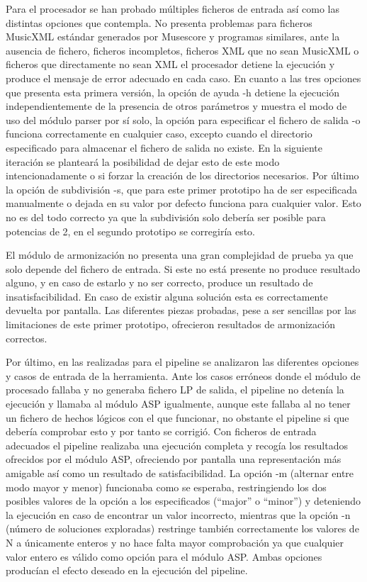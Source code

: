 Para el procesador se han probado múltiples ficheros de entrada así como las distintas opciones que contempla. No presenta problemas para ficheros MusicXML estándar generados por Musescore y programas similares, ante la ausencia de fichero, ficheros incompletos, ficheros XML que no sean MusicXML o ficheros que directamente no sean XML el procesador detiene la ejecución y produce el mensaje de error adecuado en cada caso. En cuanto a las tres opciones que presenta esta primera versión, la opción de ayuda -h detiene la ejecución independientemente de la presencia de otros parámetros y muestra el modo de uso del módulo parser por sí solo, la opción para especificar el fichero de salida -o funciona correctamente en cualquier caso, excepto cuando el directorio especificado para almacenar el fichero de salida no existe. En la siguiente iteración se planteará la posibilidad de dejar esto de este modo intencionadamente o si forzar la creación de los directorios necesarios. Por último la opción de subdivisión -s, que para este primer prototipo ha de ser especificada manualmente o dejada en su valor por defecto funciona para cualquier valor. Esto no es del todo correcto ya que la subdivisión solo debería ser posible para potencias de 2, en el segundo prototipo se corregiría esto.

El módulo de armonización no presenta una gran complejidad de prueba ya que solo depende del fichero de entrada. Si este no está presente no produce resultado alguno, y en caso de estarlo y no ser correcto, produce un resultado de insatisfacibilidad. En caso de existir alguna solución esta es correctamente devuelta por pantalla. Las diferentes piezas probadas, pese a ser sencillas por las limitaciones de este primer prototipo, ofrecieron resultados de armonización correctos.

Por último, en las realizadas para el pipeline se analizaron las diferentes opciones y casos de entrada de la herramienta. Ante los casos erróneos donde el módulo de procesado fallaba y no generaba fichero LP de salida, el pipeline no detenía la ejecución y llamaba al módulo ASP igualmente, aunque este fallaba al no tener un fichero de hechos lógicos con el que funcionar, no obstante el pipeline si que debería comprobar esto y por tanto se corrigió. Con ficheros de entrada adecuados el pipeline realizaba una ejecución completa y recogía los resultados ofrecidos por el módulo ASP, ofreciendo por pantalla una representación más amigable así como un resultado de satisfacibilidad. La opción -m (alternar entre modo mayor y menor) funcionaba como se esperaba, restringiendo los dos posibles valores de la opción a los especificados (``major'' o ``minor'') y deteniendo la ejecución en caso de encontrar un valor incorrecto, mientras que la opción -n (número de soluciones exploradas) restringe también correctamente los valores de N a únicamente enteros y no hace falta mayor comprobación ya que cualquier valor entero es válido como opción para el módulo ASP. Ambas opciones producían el efecto deseado en la ejecución del pipeline.

